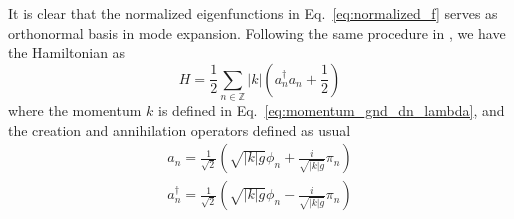 \begin{comment}
Thus, the normalized eigenfunctions are
\begin{equation}
f_n(x) = \sqrt{\frac{2}{L}}
\left\lbrace
\begin{aligned}
  \cos(kx +\frac{1}{2}kL ) &  \quad x < 0  \\
  \pm \sin(kx - \frac{1}{2}kL ) & \quad x > 0   \\
\end{aligned} \right. 
\qquad 
k = \frac{2\pi}{L}\left( n \pm  \frac{\theta}{\pi} \right)  \quad n \in \mathbb{Z} 
\end{equation}
Expand the field $\phi = \sum_n \phi_n f_n(x) $, the action and Hamiltonian becomes
\begin{equation}
  S = \frac{g}{2} \int dt \, \sum_{n \in \mathbb{Z} }\left(  \dot{\phi}^2_n + k^2 \phi_n^2 \right) \implies\quad   g \dot{\phi}_n  = \pi_n \quad \implies H =  
\frac{1}{2g}\sum_{n \in \mathbb{Z} } \pi_n^2 + ( kg )^2  \phi_n^2 
\end{equation}
\end{comment}

It is clear that the normalized eigenfunctions in Eq.~\eqref{eq:normalized_f} serves as orthonormal basis in mode expansion. Following the same procedure in , we have the Hamiltonian as
\begin{equation}
\label{eq:H_in_gnd_dn_lambda}
H = \frac{1}{2} \sum_{n \in \mathbb{Z} } |k|  \left(a^{\dagger}_n a_n + \frac{1}{2} \right)
\end{equation}
where the momentum $k$ is defined in Eq.~\eqref{eq:momentum_gnd_dn_lambda}, and the creation and annihilation operators defined as usual
\begin{equation}
\begin{aligned}
a_n = \frac{1}{\sqrt{2}} \left( \sqrt{ |k|g} \phi_n + \frac{i }{\sqrt{|k|g} }\pi_n  \right) \\
a^{\dagger}_n = \frac{1}{\sqrt{2}} \left( \sqrt{ |k|g} \phi_n - \frac{i }{\sqrt{|k|g} }\pi_n  \right) \\
\end{aligned}
\end{equation}

